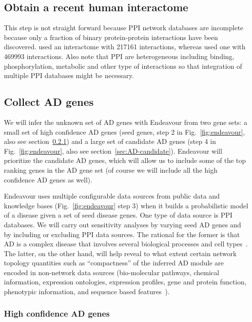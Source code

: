 \documentclass[letterpaper]{article}
\begin{document}
\subsection{Obtain a recent human interactome}

This step is not straight forward because PPI network databases are incomplete
because only a fraction of binary protein-protein interactions have been
discovered. \cite{Cheng2018} used an interactome with 217161 interactions,
whereas \cite{Bai2020} used one with 469993 interactions.  Also note that PPI
are heterogeneous including binding, phosphorylation, metabolic and other type
of interactions so that integration of multiple PPI databases might be
necessary.

\subsection{Collect AD genes}

We will infer the unknown set of AD genes with Endeavour from two gene sets: a
small set of high confidence AD genes (seed genes, step 2 in
Fig.~\ref{fig:endeavour}, also see section~\ref{sec:AD-seed}) and a large set
of candidate AD genes (step 4 in Fig.~\ref{fig:endeavour}, also see
section~\ref{sec:AD-candidate}).  Endeavour will prioritize the candidate AD
genes, which will allow us to include some of the top ranking genes in the AD
gene set (of course we will include all the high confidence AD genes as well).

Endeavour
uses multiple configurable data sources from public data and knowledge bases
(Fig.~\ref{fig:endeavour} step 3) when it builds a probabilistic model of a
disease given a set of seed disease genes. One type of data source is PPI
databases.  We will carry out sensitivity analyses by varying seed AD genes
and by including or excluding PPI data sources.  The rational for the former
is that AD is a complex disease that involves several biological processes and
cell types~\citep{DeStrooper2016}.  The latter, on the other hand, will help
reveal to what extent certain network topology quantities such as
``compactness'' of the
inferred AD module are encoded in non-network data sources (bio-molecular
pathways, chemical information, expression ontologies, expression profiles,
gene and protein function, phenotypic information, and sequence based
features~\citep{Tranchevent2016}).

\subsubsection{High confidence AD genes}
\label{sec:AD-seed}
\end{document}
